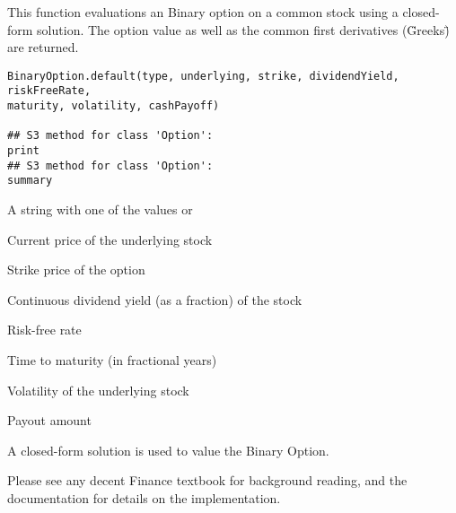 \begin{Description}\relax
This function evaluations an Binary option on a common stock
using a closed-form solution. The option value as well as the common first
derivatives (\"Greeks\") are returned.
\end{Description}
\begin{Usage}
\begin{verbatim}
BinaryOption.default(type, underlying, strike, dividendYield, riskFreeRate,
maturity, volatility, cashPayoff)

## S3 method for class 'Option':
print
## S3 method for class 'Option':
summary
\end{verbatim}
\end{Usage}
\begin{Arguments}
\begin{ldescription}
\item[\code{type}] A string with one of the values  or 
\item[\code{underlying}] Current price of the underlying stock
\item[\code{strike}] Strike price of the option
\item[\code{dividendYield}] Continuous dividend yield (as a fraction) of the stock
\item[\code{riskFreeRate}] Risk-free rate
\item[\code{maturity}] Time to maturity (in fractional years)
\item[\code{volatility}] Volatility of the underlying stock
\item[\code{cashPayoff}] Payout amount
\end{ldescription}
\end{Arguments}
\begin{Details}\relax
A closed-form solution is used to value the Binary Option.

Please see any decent Finance textbook for background reading, and
the  documentation for details on the 
implementation.
\end{Details}
